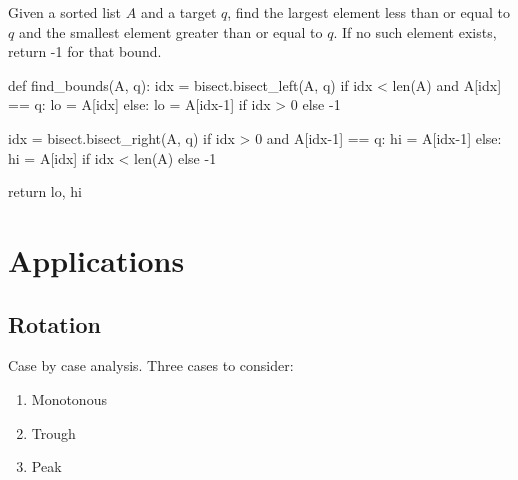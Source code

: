  Given a sorted list $A$ and a target $q$, find the largest element less than or equal to $q$ and the smallest element greater than or equal to $q$. If no such element exists, return -1 for that bound.
\begin{python}
def find_bounds(A, q):
    idx = bisect.bisect_left(A, q)
    if idx < len(A) and A[idx] == q:
        lo = A[idx]
    else:
        lo = A[idx-1] if idx > 0 else -1

    idx = bisect.bisect_right(A, q)
    if idx > 0 and A[idx-1] == q:
        hi = A[idx-1]
    else:
        hi = A[idx] if idx < len(A) else -1

    return lo, hi
\end{python}

\section{Applications}
\subsection{Rotation}
 Case by case analysis. Three cases to consider:
\begin{enumerate}
\item Monotonous 
\item Trough 
\item Peak
\end{enumerate}

